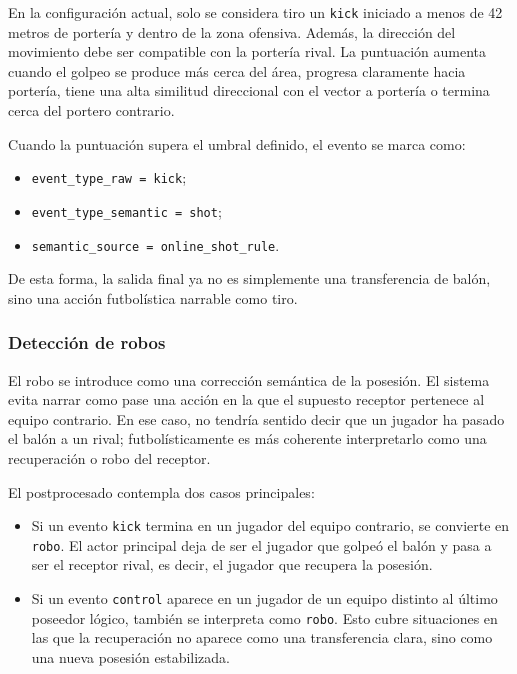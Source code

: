 En la configuración actual, solo se considera tiro un \texttt{kick} iniciado a menos de 42 metros de portería y dentro de la zona ofensiva. Además, la dirección del movimiento debe ser compatible con la portería rival. La puntuación aumenta cuando el golpeo se produce más cerca del área, progresa claramente hacia portería, tiene una alta similitud direccional con el vector a portería o termina cerca del portero contrario.

Cuando la puntuación supera el umbral definido, el evento se marca como:

\begin{itemize}
    \item \texttt{event\_type\_raw = kick};
    \item \texttt{event\_type\_semantic = shot};
    \item \texttt{semantic\_source = online\_shot\_rule}.
\end{itemize}

De esta forma, la salida final ya no es simplemente una transferencia de balón, sino una acción futbolística narrable como tiro.

\subsubsection{Detección de robos}

El robo se introduce como una corrección semántica de la posesión. El sistema evita narrar como pase una acción en la que el supuesto receptor pertenece al equipo contrario. En ese caso, no tendría sentido decir que un jugador ha pasado el balón a un rival; futbolísticamente es más coherente interpretarlo como una recuperación o robo del receptor.

El postprocesado contempla dos casos principales:

\begin{itemize}
    \item Si un evento \texttt{kick} termina en un jugador del equipo contrario, se convierte en \texttt{robo}. El actor principal deja de ser el jugador que golpeó el balón y pasa a ser el receptor rival, es decir, el jugador que recupera la posesión.
    \item Si un evento \texttt{control} aparece en un jugador de un equipo distinto al último poseedor lógico, también se interpreta como \texttt{robo}. Esto cubre situaciones en las que la recuperación no aparece como una transferencia clara, sino como una nueva posesión estabilizada.
\end{itemize}

